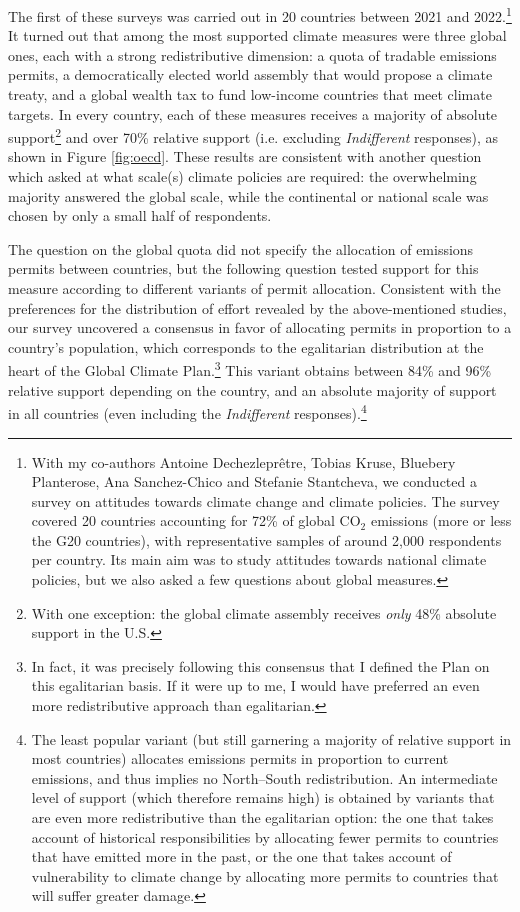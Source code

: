 \documentclass[a5paper,english,openany]{memoir}
\begin{document}
The first of these surveys was carried out in 20 countries %
between 2021 and 2022.\footnote{With my co-authors Antoine Dechezleprêtre, Tobias Kruse, Bluebery Planterose, Ana Sanchez-Chico and Stefanie Stantcheva, we conducted a survey on attitudes towards climate change and climate policies. The survey covered 20 countries accounting for 72\% of global CO$_\text{2}$ emissions (more or less the G20 countries), with representative samples of around 2,000 respondents per country. Its main aim was to study attitudes towards national climate policies, but we also asked a few questions about global measures.} It turned out that among the most supported climate measures were three global ones, each with a strong redistributive dimension: a quota of tradable emissions permits, a democratically elected world assembly that would propose a climate treaty, and a global wealth tax to fund low-income countries that meet climate targets. In every country, each of these measures receives a majority of absolute support\footnote{With one exception: the global climate assembly receives \textit{only} 48\% absolute support in the U.S.} 
and over 70\% relative support (i.e. excluding \textit{Indifferent} responses), 
as shown in Figure \ref{fig:oecd}. These results are consistent with another question which asked at what scale(s) climate policies are required: %
the overwhelming majority answered the global scale, while the continental or national scale was chosen by only a small half of respondents. 

The question on the global quota did not specify the allocation of emissions permits between countries, but the following question tested support for this measure according to different variants of permit allocation. Consistent with the preferences for the distribution of effort revealed by the above-mentioned studies, our survey uncovered a consensus in favor of allocating permits in proportion to a country's population, which corresponds to the egalitarian distribution at the heart of the Global Climate Plan.\footnote{In fact, it was precisely following this consensus that I defined the Plan on this egalitarian basis. If it were up to me, I would have preferred an even more redistributive approach than egalitarian.} This variant obtains between 84\% and 96\% relative support depending on the country, and an absolute majority of support in all countries (even including the \textit{Indifferent} responses).\footnote{The least popular variant (but still garnering a majority of relative support in most countries) allocates emissions permits in proportion to current emissions, and thus implies no North--South redistribution. An intermediate level of support (which therefore remains high) is obtained by variants that are even more redistributive than the egalitarian option: the one that takes account of historical responsibilities by allocating fewer permits to countries that have emitted more in the past, or the one that takes account of vulnerability to climate change by allocating more permits to countries that will suffer greater damage.}
\end{document}
